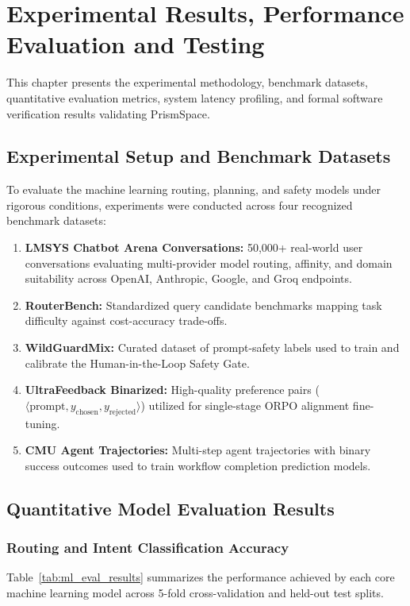 \documentclass[12pt,a4paper]{report}
\begin{document}
\chapter{Experimental Results, Performance Evaluation and Testing}

This chapter presents the experimental methodology, benchmark datasets, quantitative evaluation metrics, system latency profiling, and formal software verification results validating PrismSpace.

\section{Experimental Setup and Benchmark Datasets}
To evaluate the machine learning routing, planning, and safety models under rigorous conditions, experiments were conducted across four recognized benchmark datasets:
\begin{enumerate}
    \item \textbf{LMSYS Chatbot Arena Conversations:} 50,000+ real-world user conversations evaluating multi-provider model routing, affinity, and domain suitability across OpenAI, Anthropic, Google, and Groq endpoints.
    \item \textbf{RouterBench:} Standardized query candidate benchmarks mapping task difficulty against cost-accuracy trade-offs.
    \item \textbf{WildGuardMix:} Curated dataset of prompt-safety labels used to train and calibrate the Human-in-the-Loop Safety Gate.
    \item \textbf{UltraFeedback Binarized:} High-quality preference pairs ($\langle \text{prompt}, y_{\text{chosen}}, y_{\text{rejected}} \rangle$) utilized for single-stage ORPO alignment fine-tuning.
    \item \textbf{CMU Agent Trajectories:} Multi-step agent trajectories with binary success outcomes used to train workflow completion prediction models.
\end{enumerate}

\section{Quantitative Model Evaluation Results}

\subsection{Routing and Intent Classification Accuracy}
Table~\ref{tab:ml_eval_results} summarizes the performance achieved by each core machine learning model across 5-fold cross-validation and held-out test splits.
\end{document}
